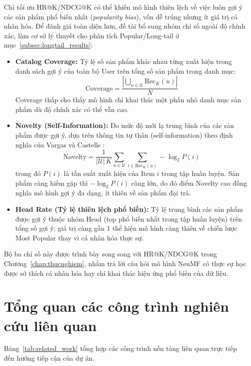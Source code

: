 Chỉ tối ưu HR@K/NDCG@K có thể khiến mô hình thiên lệch về việc luôn gợi ý các sản phẩm phổ biến nhất (\textit{popularity bias}), vốn dễ trúng nhưng ít giá trị cá nhân hóa. Để đánh giá toàn diện hơn, đề tài bổ sung nhóm chỉ số ngoài độ chính xác, làm cơ sở lý thuyết cho phân tích Popular/Long-tail ở mục~\ref{subsec:longtail_results}:
\begin{itemize}
    \item \textbf{Catalog Coverage:} Tỷ lệ số sản phẩm khác nhau từng xuất hiện trong danh sách gợi ý của toàn bộ User trên tổng số sản phẩm trong danh mục:
    \begin{equation}
        \text{Coverage} = \frac{\left| \bigcup_{u \in \mathcal{U}} \text{Rec}_K(u) \right|}{N}
        \label{eq:coverage}
    \end{equation}
    Coverage thấp cho thấy mô hình chỉ khai thác một phần nhỏ danh mục sản phẩm dù độ chính xác có thể vẫn cao.
    \item \textbf{Novelty (Self-Information):} Đo mức độ mới lạ trung bình của các sản phẩm được gợi ý, dựa trên thông tin tự thân (self-information) theo định nghĩa của Vargas và Castells \parencite{vargas2011novelty}:
    \begin{equation}
        \text{Novelty} = \frac{1}{|\mathcal{U}|\,K}\sum_{u \in \mathcal{U}} \sum_{i \in \text{Rec}_K(u)} -\log_2 P(i)
        \label{eq:novelty}
    \end{equation}
    trong đó $P(i)$ là tần suất xuất hiện của Item $i$ trong tập huấn luyện. Sản phẩm càng hiếm gặp thì $-\log_2 P(i)$ càng lớn, do đó điểm Novelty cao đồng nghĩa mô hình gợi ý đa dạng, ít thiên về sản phẩm đại trà.
    \item \textbf{Head Rate (Tỷ lệ thiên lệch phổ biến):} Tỷ lệ trung bình các sản phẩm được gợi ý thuộc nhóm Head (top phổ biến nhất trong tập huấn luyện) trên tổng số gợi ý; giá trị càng gần 1 thể hiện mô hình càng thiên về chiến lược Most Popular thay vì cá nhân hóa thực sự.
\end{itemize}
Bộ ba chỉ số này được trình bày song song với HR@K/NDCG@K trong Chương~\ref{chap:thucnghiem}, nhằm trả lời câu hỏi mô hình NeuMF có thực sự học được sở thích cá nhân hóa hay chỉ khai thác hiệu ứng phổ biến của dữ liệu.

\section{Tổng quan các công trình nghiên cứu liên quan}
\label{sec:related_work}

Bảng~\ref{tab:related_work} tổng hợp các công trình nền tảng liên quan trực tiếp đến hướng tiếp cận của dự án.

